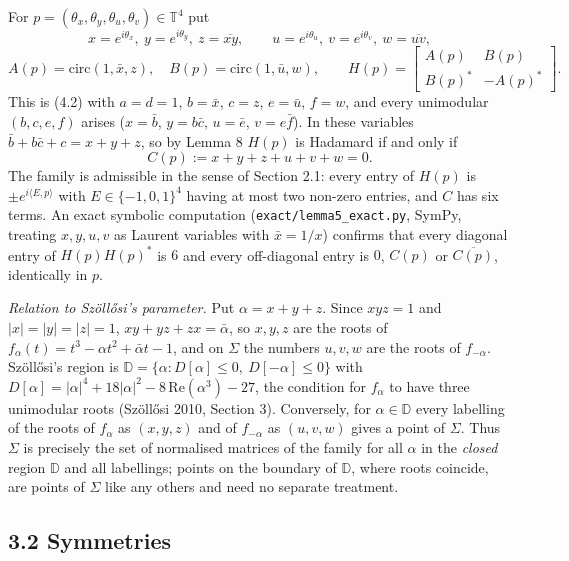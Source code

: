 \documentclass[
  11pt,
]{article}
\begin{document}
For \(p=(\theta_x,\theta_y,\theta_u,\theta_v)\in\mathbb T^4\) put \[
x=e^{i\theta_x},\ y=e^{i\theta_y},\ z=\overline{xy},\qquad u=e^{i\theta_u},\ v=e^{i\theta_v},\ w=\overline{uv},
\] \[
A(p)=\mathrm{circ}(1,\bar x,z),\quad B(p)=\mathrm{circ}(1,\bar u,w),\qquad H(p)=\begin{bmatrix}A(p)&B(p)\\ B(p)^*&-A(p)^*\end{bmatrix}.
\] This is (4.2) with \(a=d=1\), \(b=\bar x\), \(c=z\), \(e=\bar u\),
\(f=w\), and every unimodular \((b,c,e,f)\) arises (\(x=\bar b\),
\(y=b\bar c\), \(u=\bar e\), \(v=e\bar f\)). In these variables
\(\bar b+b\bar c+c=x+y+z\), so by Lemma 8 \(H(p)\) is Hadamard if and
only if \[
C(p):=x+y+z+u+v+w=0. \tag{C}
\] The family is admissible in the sense of Section 2.1: every entry of
\(H(p)\) is \(\pm e^{i\langle E,p\rangle}\) with \(E\in\{-1,0,1\}^4\)
having at most two non-zero entries, and \(C\) has six terms. An exact
symbolic computation (\texttt{exact/lemma5\_exact.py}, SymPy, treating
\(x,y,u,v\) as Laurent variables with \(\bar x=1/x\)) confirms that
every diagonal entry of \(H(p)H(p)^*\) is \(6\) and every off-diagonal
entry is \(0\), \(C(p)\) or \(\overline{C(p)}\), identically in \(p\).

\emph{Relation to Szöllősi's parameter.} Put \(\alpha=x+y+z\). Since
\(xyz=1\) and \(|x|=|y|=|z|=1\), \(xy+yz+zx=\bar\alpha\), so \(x,y,z\)
are the roots of \(f_\alpha(t)=t^3-\alpha t^2+\bar\alpha t-1\), and on
\(\Sigma\) the numbers \(u,v,w\) are the roots of \(f_{-\alpha}\).
Szöllősi's region is
\(\mathbb D=\{\alpha: D[\alpha]\le0,\ D[-\alpha]\le0\}\) with
\(D[\alpha]=|\alpha|^4+18|\alpha|^2-8\,\mathrm{Re}(\alpha^3)-27\), the
condition for \(f_\alpha\) to have three unimodular roots (Szöllősi
2010, Section 3). Conversely, for \(\alpha\in\mathbb D\) every labelling
of the roots of \(f_\alpha\) as \((x,y,z)\) and of \(f_{-\alpha}\) as
\((u,v,w)\) gives a point of \(\Sigma\). Thus \(\Sigma\) is precisely
the set of normalised matrices of the family for all \(\alpha\) in the
\emph{closed} region \(\mathbb D\) and all labellings; points on the
boundary of \(\mathbb D\), where roots coincide, are points of
\(\Sigma\) like any others and need no separate treatment.

\subsection{3.2 Symmetries}\label{symmetries}
\end{document}

